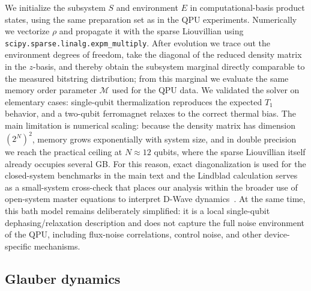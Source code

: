 \documentclass[aps,prapplied,reprint,superscriptaddress,floatfix,nofootinbib]{revtex4-2}
\begin{document}
We initialize the subsystem $S$ and environment $E$ in computational-basis product states, using the same preparation set as in the QPU experiments.
Numerically we vectorize $\rho$ and propagate it with the sparse Liouvillian using \texttt{scipy.sparse.linalg.expm\_multiply}.
After evolution we trace out the environment degrees of freedom, take the diagonal of the reduced density matrix in the $z$-basis, and thereby obtain the subsystem marginal directly comparable to the measured bitstring distribution; from this marginal we evaluate the same memory order parameter $\mathcal{M}$ used for the QPU data.
We validated the solver on elementary cases: single-qubit thermalization reproduces the expected $T_1$ behavior, and a two-qubit ferromagnet relaxes to the correct thermal bias.
The main limitation is numerical scaling: because the density matrix has dimension $(2^N)^2$, memory grows exponentially with system size, and in double precision we reach the practical ceiling at $N \approx 12$ qubits, where the sparse Liouvillian itself already occupies several GB.
For this reason, exact diagonalization is used for the closed-system benchmarks in the main text and the Lindblad calculation serves as a small-system cross-check that places our analysis within the broader use of open-system master equations to interpret D-Wave dynamics~\cite{mehta2025dwave}.
At the same time, this bath model remains deliberately simplified: it is a local single-qubit dephasing/relaxation description and does not capture the full noise environment of the QPU, including flux-noise correlations, control noise, and other device-specific mechanisms.

\subsection{Glauber dynamics}
\label{sec:glauber}
\end{document}
